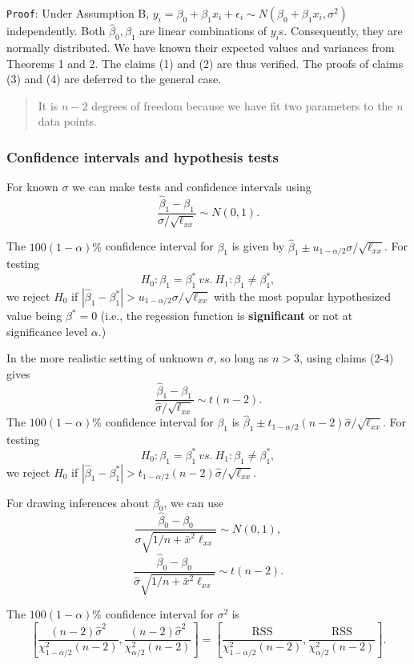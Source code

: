 \documentclass[]{article}
\begin{document}
\texttt{Proof}: Under Assumption B,
\(y_i=\beta_0+\beta_1x_i+\epsilon_i\sim N(\beta_0+\beta_1x_i,\sigma^2)\)
independently. Both \(\hat\beta_0,\hat\beta_1\) are linear combinations
of \(y_i\)s. Consequently, they are normally distributed. We have known
their expected values and variances from Theorems 1 and 2. The claims
(1) and (2) are thus verified. The proofs of claims (3) and (4) are
deferred to the general case.

\begin{quote}
It is \(n-2\) degrees of freedom because we have fit two parameters to
the \(n\) data points.
\end{quote}

\hypertarget{confidence-intervals-and-hypothesis-tests}{%
\subsubsection{Confidence intervals and hypothesis
tests}\label{confidence-intervals-and-hypothesis-tests}}

For known \(\sigma\) we can make tests and confidence intervals using
\[\frac{\hat\beta_1-\beta_1}{\sigma/\sqrt{\ell_{xx}}}\sim N(0,1).\]

The \(100(1-\alpha)\%\) confidence interval for \(\beta_1\) is given by
\(\hat\beta_1\pm u_{1-\alpha/2}\sigma/\sqrt{\ell_{xx}}\). For testing
\[H_0:\beta_1=\beta_1^*\ vs.\ H_1:\beta_1\neq\beta_1^*,\] we reject
\(H_0\) if
\(|\hat\beta_1-\beta_1^*|>u_{1-\alpha/2}\sigma/\sqrt{\ell_{xx}}\) with
the most popular hypothesized value being \(\beta^*=0\) (i.e., the
regession function is \textbf{significant} or not at significance level
\(\alpha\).)

In the more realistic setting of unknown \(\sigma\), so long as
\(n > 3\), using claims (2-4) gives
\[\frac{\hat\beta_1-\beta_1}{\hat{\sigma}/\sqrt{\ell_{xx}}}\sim t(n-2).\]
The \(100(1-\alpha)\%\) confidence interval for \(\beta_1\) is
\(\hat\beta_1\pm t_{1-\alpha/2}(n-2)\hat{\sigma}/\sqrt{\ell_{xx}}\). For
testing \[H_0:\beta_1=\beta_1^*\ vs.\ H_1:\beta_1\neq\beta_1^*,\] we
reject \(H_0\) if
\(|\hat\beta_1-\beta_1^*|>t_{1-\alpha/2}(n-2)\hat\sigma/\sqrt{\ell_{xx}}\).

For drawing inferences about \(\beta_0\), we can use
\[\frac{\hat\beta_0-\beta_0}{\sigma\sqrt{1/n+\bar x^2\ell_{xx}}}\sim N(0,1),\]
\[\frac{\hat\beta_0-\beta_0}{\hat\sigma\sqrt{1/n+\bar x^2\ell_{xx}}}\sim t(n-2).\]

The \(100(1-\alpha)\%\) confidence interval for \(\sigma^2\) is
\[\left[\frac{(n-2)\hat\sigma^2}{\chi_{1-\alpha/2}^2(n-2)},\frac{(n-2)\hat\sigma^2}{\chi_{\alpha/2}^2(n-2)}\right]=\left[\frac{\mathrm{RSS}}{\chi_{1-\alpha/2}^2(n-2)},\frac{\mathrm{RSS}}{\chi_{\alpha/2}^2(n-2)}\right].\]
\end{document}

